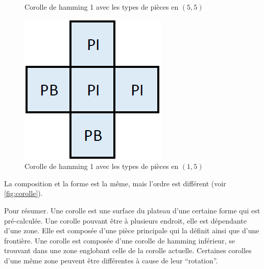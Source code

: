 \begin{exmp}
\begin{minipage}{0.24\textwidth}
\begin{figure}[H]
				\caption{Corolle de hamming 1 avec les types de pièces en $(5,5)$}
				\label{fig:corolle_zone_orientee_2}
			\end{figure}
		\end{minipage}\hfill
		\begin{minipage}{0.24\textwidth}
			\begin{figure}[H]
				\centering
				\includegraphics[width=\linewidth]{images/corolle_zone_orientee_3}
				\caption{Corolle de hamming 1 avec les types de pièces en $(1,5)$}
				\label{fig:corolle_zone_orientee_3}
			\end{figure}
		\end{minipage}\hfill
		
		La composition et la forme est la même, mais l'ordre est différent (voir \autoref{fig:corolle}).
	\end{exmp}
	
	Pour résumer. Une corolle est une surface du plateau d'une certaine forme qui est pré-calculée. Une corolle pouvant être à plusieurs endroit, elle est dépendante d'une zone. Elle est composée d'une pièce principale qui la définit ainsi que d'une frontière. Une corolle est composée d'une corolle de hamming inférieur, se trouvant dans une zone englobant celle de la corolle actuelle. Certaines corolles d'une même zone peuvent être différentes à cause de leur \enquote{rotation}.
	
